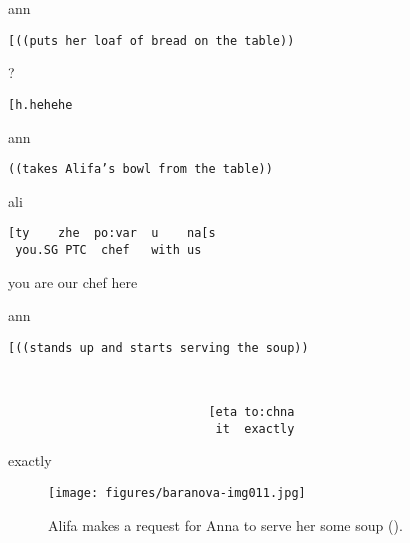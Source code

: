 \documentclass[output=paper,modfonts,nonflat]{langsci/langscibook}
\begin{document}
%
\begin{mdframednoverticalspace}[style=secondfoc]
\begin{transbox}{10}{ann}
\begin{verbatim}
[((puts her loaf of bread on the table))
\end{verbatim}
\end{transbox}
\end{mdframednoverticalspace}
%
\begin{transbox}{11}{?}
\begin{verbatim}
[h.hehehe
\end{verbatim}
\end{transbox}
%
%
\begin{mdframednoverticalspace}[style=secondfoc]
\begin{transbox}{13}{ann}
\begin{verbatim}
((takes Alifa’s bowl from the table))
\end{verbatim}
\end{transbox}
\end{mdframednoverticalspace}
%
\begin{transbox}{14}{ali}%
\begin{verbatim}
[ty    zhe  po:var  u    na[s
 you.SG PTC  chef   with us
\end{verbatim}
\hspace{0.07cm} you are our chef here
\end{transbox}
%
\begin{mdframednoverticalspace}[style=secondfoc]
\begin{transbox}{15}{ann}
\begin{verbatim}
[((stands up and starts serving the soup))
\end{verbatim}
\end{transbox}
\end{mdframednoverticalspace}\vspace{-1mm}
%
\begin{transbox}{16}{~}
\begin{verbatim}
                            [eta to:chna
                             it  exactly
\end{verbatim}
\hspace{4.3cm} exactly
\end{transbox}\bigskip

\begin{figure}
\caption{Alifa makes a request for Anna to serve her some soup ().}
\label{fig:baranova:11}
\texttt{[image: figures/baranova-img011.jpg]}
\end{figure}
\end{document}
